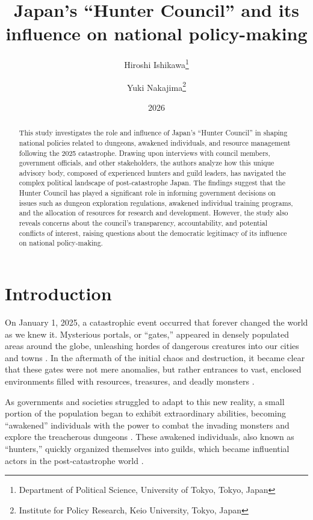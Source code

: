\documentclass[12pt, a4paper]{article}
\title{Japan's ``Hunter Council'' and its influence on national policy-making}
\author{Hiroshi Ishikawa\footnote{Department of Political Science, University of Tokyo, Tokyo, Japan} \and Yuki Nakajima\footnote{Institute for Policy Research, Keio University, Tokyo, Japan}}
\date{2026}
\begin{document}
\maketitle

\begin{abstract}
This study investigates the role and influence of Japan's ``Hunter Council'' in shaping national policies related to dungeons, awakened individuals, and resource management following the 2025 catastrophe. Drawing upon interviews with council members, government officials, and other stakeholders, the authors analyze how this unique advisory body, composed of experienced hunters and guild leaders, has navigated the complex political landscape of post-catastrophe Japan. The findings suggest that the Hunter Council has played a significant role in informing government decisions on issues such as dungeon exploration regulations, awakened individual training programs, and the allocation of resources for research and development. However, the study also reveals concerns about the council's transparency, accountability, and potential conflicts of interest, raising questions about the democratic legitimacy of its influence on national policy-making.
\end{abstract}

\section{Introduction}

On January 1, 2025, a catastrophic event occurred that forever changed the world as we knew it. Mysterious portals, or ``gates,'' appeared in densely populated areas around the globe, unleashing hordes of dangerous creatures into our cities and towns \citep{nakano2025spatial, kim2027emergence}. In the aftermath of the initial chaos and destruction, it became clear that these gates were not mere anomalies, but rather entrances to vast, enclosed environments filled with resources, treasures, and deadly monsters \citep{yamamoto2026comparative}.

As governments and societies struggled to adapt to this new reality, a small portion of the population began to exhibit extraordinary abilities, becoming ``awakened'' individuals with the power to combat the invading monsters and explore the treacherous dungeons \citep{novikova2027morphological, gao2026gut}. These awakened individuals, also known as ``hunters,'' quickly organized themselves into guilds, which became influential actors in the post-catastrophe world \citep{nguyen2026rise, nakano2026rise}.
\end{document}
